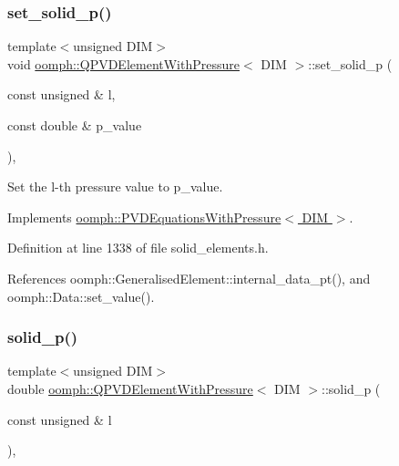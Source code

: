\subsubsection{\texorpdfstring{set\+\_\+solid\+\_\+p()}{set\_solid\_p()}}
{\footnotesize\ttfamily template$<$unsigned D\+IM$>$ \\
void \hyperlink{classoomph_1_1QPVDElementWithPressure}{oomph\+::\+Q\+P\+V\+D\+Element\+With\+Pressure}$<$ D\+IM $>$\+::set\+\_\+solid\+\_\+p (\begin{DoxyParamCaption}\item[{const unsigned \&}]{l,  }\item[{const double \&}]{p\+\_\+value }\end{DoxyParamCaption})\hspace{0.3cm}{\ttfamily [inline]}, {\ttfamily [virtual]}}



Set the l-\/th pressure value to p\+\_\+value. 



Implements \hyperlink{classoomph_1_1PVDEquationsWithPressure_a35b462a689e05929fa15a9abd2b920f0}{oomph\+::\+P\+V\+D\+Equations\+With\+Pressure$<$ D\+I\+M $>$}.



Definition at line 1338 of file solid\+\_\+elements.\+h.



References oomph\+::\+Generalised\+Element\+::internal\+\_\+data\+\_\+pt(), and oomph\+::\+Data\+::set\+\_\+value().

\mbox{\label{classoomph_1_1QPVDElementWithPressure_ae60d58f767b89eb8ecf147da5e646bf3}} 
\subsubsection{\texorpdfstring{solid\+\_\+p()}{solid\_p()}}
{\footnotesize\ttfamily template$<$unsigned D\+IM$>$ \\
double \hyperlink{classoomph_1_1QPVDElementWithPressure}{oomph\+::\+Q\+P\+V\+D\+Element\+With\+Pressure}$<$ D\+IM $>$\+::solid\+\_\+p (\begin{DoxyParamCaption}\item[{const unsigned \&}]{l }\end{DoxyParamCaption})\hspace{0.3cm}{\ttfamily [inline]}, {\ttfamily [virtual]}}



